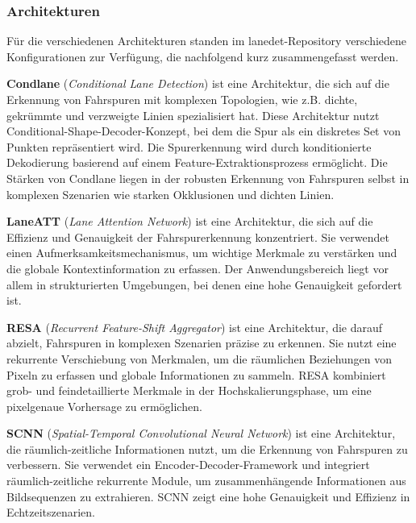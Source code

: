 \documentclass{article}
\begin{document}
            \subsubsection{Architekturen}
                Für die verschiedenen Architekturen standen im lanedet-Repository verschiedene Konfigurationen zur Verfügung, die nachfolgend kurz zusammengefasst werden.

                \textbf{Condlane} (\textit{Conditional Lane Detection}) ist eine Architektur, die sich auf die Erkennung von Fahrspuren mit komplexen Topologien, wie z.B. dichte, gekrümmte und verzweigte Linien spezialisiert hat. Diese Architektur nutzt Conditional-Shape-Decoder-Konzept, bei dem die Spur als ein diskretes Set von Punkten repräsentiert wird. Die Spurerkennung wird durch konditionierte Dekodierung basierend auf einem Feature-Extraktionsprozess ermöglicht. Die Stärken von Condlane liegen in der robusten Erkennung von Fahrspuren selbst in komplexen Szenarien wie starken Okklusionen und dichten Linien.
                \cite{Ganeriwala2023Cross}

                \textbf{LaneATT} (\textit{Lane Attention Network}) ist eine Architektur, die sich auf die Effizienz und Genauigkeit der Fahrspurerkennung konzentriert. Sie verwendet einen Aufmerksamkeitsmechanismus, um wichtige Merkmale zu verstärken und die globale Kontextinformation zu erfassen. Der Anwendungsbereich liegt vor allem in strukturierten Umgebungen, bei denen eine hohe Genauigkeit gefordert ist. 
                \cite{He2021Fast}

                \textbf{RESA} (\textit{Recurrent Feature-Shift Aggregator}) ist eine Architektur, die darauf abzielt, Fahrspuren in komplexen Szenarien präzise zu erkennen. Sie nutzt eine rekurrente Verschiebung von Merkmalen, um die räumlichen Beziehungen von Pixeln zu erfassen und globale Informationen zu sammeln. RESA kombiniert grob- und feindetaillierte Merkmale in der Hochskalierungsphase, um eine pixelgenaue Vorhersage zu ermöglichen.
                \cite{Zheng2020RESA}

                \textbf{SCNN} (\textit{Spatial-Temporal Convolutional Neural Network}) ist eine Architektur, die räumlich-zeitliche Informationen nutzt, um die Erkennung von Fahrspuren zu verbessern. Sie verwendet ein Encoder-Decoder-Framework und integriert räumlich-zeitliche rekurrente Module, um zusammenhängende Informationen aus Bildsequenzen zu extrahieren. SCNN zeigt eine hohe Genauigkeit und Effizienz in Echtzeitszenarien.
                \cite{Li2024Enhanced}
\end{document}
